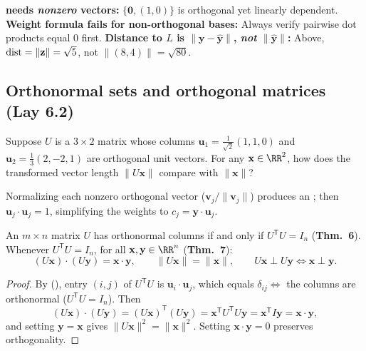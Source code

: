 \documentclass[10pt]{scrartcl}
\newcommand{\vv}[1]{\mathbf{#1}}
\begin{document}
\begin{trapbox}
  \ii \textbf{ needs \emph{nonzero} vectors:} $\{\vv 0,(1,0)\}$ is orthogonal yet linearly dependent.
  \ii \textbf{Weight formula fails for non-orthogonal bases:} Always verify pairwise dot products equal $0$ first.
  \ii \textbf{Distance to $L$ is $\|\vv y-\hat{\vv y}\|$, \emph{not} $\|\hat{\vv y}\|$:} Above, $\dist=\|\vv z\|=\sqrt{5}$, not $\|(8,4)\|=\sqrt{80}$.
\end{trapbox}

\subsection{Orthonormal sets and orthogonal matrices (Lay 6.2)}

\begin{qbox}
  Suppose $U$ is a $3\times2$ matrix whose columns $\vv u_1=\frac{1}{\sqrt{2}}(1,1,0)$ and $\vv u_2=\frac{1}{3}(2,-2,1)$ are orthogonal unit vectors. For any $\vv x\in\RR^2$, how does the transformed vector length $\|U\vv x\|$ compare with $\|\vv x\|$?
\end{qbox}

Normalizing each nonzero orthogonal vector ($\vv v_j/\|\vv v_j\|$) produces an ; then $\vv u_j\cdot\vv u_j=1$, simplifying the  weights to $c_j=\vv y\cdot\vv u_j$.

\begin{theorem*}
  An $m\times n$ matrix $U$ has orthonormal columns if and only if $U^{\mathsf T}U = I_n$ (\textbf{Thm.~6}). Whenever $U^{\mathsf T}U = I_n$, for all $\vv x,\vv y\in\RR^n$ (\textbf{Thm.~7}):
  \[
    (U\vv x)\cdot(U\vv y) = \vv x\cdot\vv y, \qquad
    \|U\vv x\| = \|\vv x\|, \qquad
    U\vv x \perp U\vv y \iff \vv x\perp\vv y.
  \]
\end{theorem*}
\begin{proof}
  By (), entry $(i,j)$ of $U^{\mathsf T}U$ is $\vv u_i\cdot\vv u_j$, which equals $\delta_{ij} \iff$ the columns are orthonormal ($U^{\mathsf T}U=I_n$). Then
  \[
    (U\vv x)\cdot(U\vv y) = (U\vv x)^{\mathsf T}(U\vv y) = \vv x^{\mathsf T}U^{\mathsf T}U\vv y = \vv x^{\mathsf T}I\vv y = \vv x\cdot\vv y,
  \]
  and setting $\vv y=\vv x$ gives $\|U\vv x\|^2=\|\vv x\|^2$. Setting $\vv x\cdot\vv y=0$ preserves orthogonality.
\end{proof}
\end{document}
